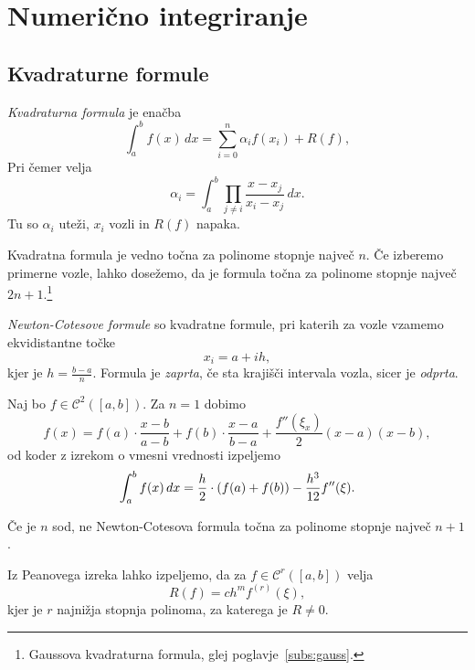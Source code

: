 \section{Numerično integriranje}

\subsection{Kvadraturne formule}

\begin{definicija}
\emph{Kvadraturna formula} je enačba
\[
\int_a^b f(x)\,dx = \sum_{i=0}^n \alpha_i f(x_i) + R(f),
\]
Pri čemer velja
\[
\alpha_i = \int_a^b \prod_{j \ne i} \frac{x - x_j}{x_i - x_j}\,dx.
\]
Tu so $\alpha_i$ uteži, $x_i$ vozli in $R(f)$ napaka.
\end{definicija}

\begin{opomba}
Kvadratna formula je vedno točna za polinome stopnje največ $n$. Če
izberemo primerne vozle, lahko dosežemo, da je formula točna za
polinome stopnje največ $2n+1$.\footnote{Gaussova kvadraturna
formula, glej poglavje~\ref{subs:gauss}.}
\end{opomba}

\begin{definicija}
\emph{Newton-Cotesove formule} so
kvadratne formule, pri katerih za vozle vzamemo ekvidistantne točke
\[
x_i = a + ih,
\]
kjer je $h = \frac{b-a}{n}$. Formula je \emph{zaprta}, če sta
krajišči intervala vozla, sicer je \emph{odprta}.
\end{definicija}

\begin{opomba}
Naj bo $f \in \mathcal{C}^2([a,b])$. Za $n=1$ dobimo
\[
f(x) = f(a) \cdot \frac{x-b}{a-b} + f(b) \cdot \frac{x-a}{b-a} +
\frac{f''(\xi_x)}{2} (x-a)(x-b),
\]
od koder z izrekom o vmesni vrednosti izpeljemo
\[
\int_a^b f(x)\,dx =
\frac{h}{2} \cdot \left(f(a) + f(b)\right) - \frac{h^3}{12} f''(\xi).
\]
\end{opomba}

\begin{opomba}
Če je $n$ sod, ne Newton-Cotesova formula točna za polinome stopnje
največ $n+1$.
\end{opomba}

\begin{opomba}
Iz Peanovega izreka lahko izpeljemo, da za
$f \in \mathcal{C}^r([a,b])$ velja
\[
R(f) = c h^m f^{(r)}(\xi),
\]
kjer je $r$ najnižja stopnja polinoma, za katerega je $R \ne 0$.
\end{opomba}

